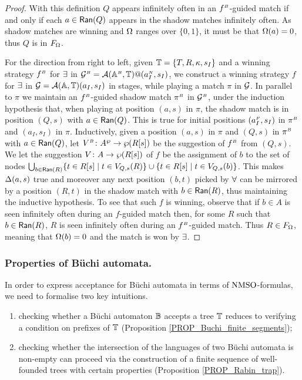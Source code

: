 \begin{proof}
With this definition $Q$ appears infinitely often in an $f^{{\scriptscriptstyle B}}$-guided match if and only if each $a \in \mathsf{Ran}(Q)$ appears in the shadow matches infinitely often. As shadow matches are winning and $\Omega$ ranges over $\{0,1\}$, it must be that $\Omega(a) = 0$, thus $Q$ is in $F_{\Omega}$.

For the direction from right to left, given $\mathbb{T} = \{ T,R,\kappa,s_I\}$ and a winning strategy $f^{{\scriptscriptstyle B}}$ for $\exists$ in $\mathcal{G}^{{\scriptscriptstyle B}} = \mathcal{A}(\mathbb{A}^{{\scriptscriptstyle B}},\mathbb{T})@(a_I^{{\scriptscriptstyle N}},s_I)$, we construct a winning strategy $f$ for $\exists$ in $\mathcal{G} = \mathcal{A}(\mathbb{A},\mathbb{T})(a_I,s_I)$ in stages, while playing a match $\pi$ in $\mathcal{G}$. In parallel to $\pi$ we maintain an $f^{{\scriptscriptstyle B}}$-guided shadow match $\pi^{{\scriptscriptstyle B}}$ in $\mathcal{G}^{{\scriptscriptstyle B}}$, under the induction hypothesis that, when playing at position $(a,s)$ in $\pi$, the shadow match is in position $(Q,s)$ with $a \in \mathsf{Ran}(Q)$. This is true for initial positions $(a_I^{{\scriptscriptstyle F}},s_I)$ in $\pi^{{\scriptscriptstyle B}}$ and $(a_I,s_I)$ in $\pi$. Inductively, given a position $(a,s)$ in $\pi$ and $(Q,s)$ in $\pi^{{\scriptscriptstyle B}}$ with $a \in \mathsf{Ran}(Q)$, let $V^{{\scriptscriptstyle B}} \colon A^{\wp} \rightarrow \wp (R[s])$ be the suggestion of $f^{{\scriptscriptstyle B}}$ from $(Q,s)$. We let the suggestion $V \colon A \rightarrow \wp (R[s])$ of $f$ be the assignment of $b$ to the set of nodes $\bigcup_{b \in \mathsf{Ran}(R)} \{t \in R[s] \mid t \in V_{Q,s}(R)\} \cup  \{t \in R[s] \mid t \in V_{Q,s}(b)\}$. This makes $\Delta(a,s)$ true and moreover any next position $(b,t)$ picked by $\forall$ can be mirrored by a position $(R,t)$ in the shadow match with $b \in \mathsf{Ran}(R)$, thus maintaining the inductive hypothesis. To see that such $f$ is winning, observe that if $b \in A$ is seen infinitely often during an $f$-guided match then, for some $R$ such that $b \in \mathsf{Ran}(R)$, $R$ is seen infinitely often during an $f^{{\scriptscriptstyle B}}$-guided match. Thus $R \in F_{\Omega}$, meaning that $\Omega(b) = 0$ and the match is won by $\exists$.
\end{proof}

\subsubsection{Properties of B\"{u}chi automata.}\label{sec:propsBuchi}

In order to express acceptance for B\"{u}chi
automata in terms of $\mathrm{NMSO}$-formulas, we need to formalise two key intuitions.
\begin{enumerate}
\item checking whether a B\"{u}chi automaton $\mathbb{B}$
  accepts a tree $\mathbb{T}$ reduces to verifying a condition on prefixes of
  $\mathbb{T}$ (Proposition \ref{PROP_Buchi_finite_segments});
\item checking whether the intersection of the languages of two
   B\"{u}chi automata is non-empty can proceed via the
  construction of a finite sequence of well-founded trees with certain
  properties (Proposition \ref{PROP_Rabin_trap}).
\end{enumerate}

